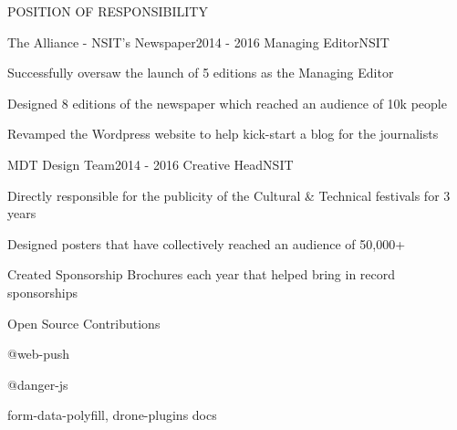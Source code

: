\documentclass{resume} %
\begin{document}
\begin{rSection}{POSITION OF RESPONSIBILITY}

    \begin{rSubsection}{The Alliance - NSIT's Newspaper}{2014 - 2016}
        {Managing Editor}{NSIT}
        
        \item Successfully oversaw the launch of 5 editions as the Managing Editor
        \item Designed 8 editions of the newspaper which reached an audience of 10k people
        \item Revamped the Wordpress website to help kick-start a blog for the journalists
    \end{rSubsection}


    \begin{rSubsection}{MDT Design Team}{2014 - 2016}
        {Creative Head}{NSIT}
        
        \item Directly responsible for the publicity of the Cultural \& Technical festivals for 3 years
        \item Designed posters that have collectively reached an audience of 50,000+
        \item Created Sponsorship Brochures each year that helped bring in record sponsorships
    \end{rSubsection}

\end{rSection}



\begin{rSection}{Open Source Contributions}
    \item @web-push
    \item @danger-js
    \item form-data-polyfill, drone-plugins docs
\end{rSection}
\end{document}
